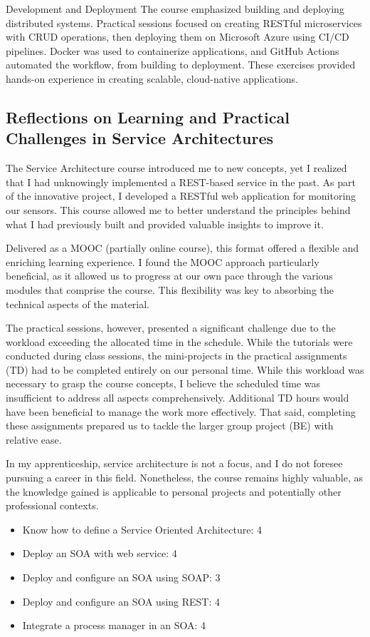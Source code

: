 Development and Deployment
The course emphasized building and deploying distributed systems. Practical sessions focused on creating RESTful microservices with CRUD operations, then deploying them on Microsoft Azure using CI/CD pipelines. Docker was used to containerize applications, and GitHub Actions automated the workflow, from building to deployment. These exercises provided hands-on experience in creating scalable, cloud-native applications.

\subsection{Reflections on Learning and Practical Challenges in Service Architectures}

The Service Architecture course introduced me to new concepts, yet I realized that I had unknowingly implemented a REST-based service in the past. As part of the innovative project, I developed a RESTful web application for monitoring our sensors. This course allowed me to better understand the principles behind what I had previously built and provided valuable insights to improve it.

Delivered as a MOOC (partially online course), this format offered a flexible and enriching learning experience. I found the MOOC approach particularly beneficial, as it allowed us to progress at our own pace through the various modules that comprise the course. This flexibility was key to absorbing the technical aspects of the material.

The practical sessions, however, presented a significant challenge due to the workload exceeding the allocated time in the schedule. While the tutorials were conducted during class sessions, the mini-projects in the practical assignments (TD) had to be completed entirely on our personal time. While this workload was necessary to grasp the course concepts, I believe the scheduled time was insufficient to address all aspects comprehensively. Additional TD hours would have been beneficial to manage the work more effectively. That said, completing these assignments prepared us to tackle the larger group project (BE) with relative ease.

In my apprenticeship, service architecture is not a focus, and I do not foresee pursuing a career in this field. Nonetheless, the course remains highly valuable, as the knowledge gained is applicable to personal projects and potentially other professional contexts.

\begin{itemize}
    \item Know how to define a Service Oriented Architecture: 4
    \item Deploy an SOA with web service: 4
    \item Deploy and configure an SOA using SOAP: 3
    \item Deploy and configure an SOA using REST: 4
    \item Integrate a process manager in an SOA: 4
\end{itemize}



